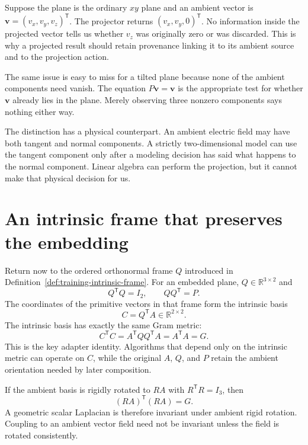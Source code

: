 Suppose the plane is the ordinary $xy$ plane and an ambient vector is
$\mathbf v=(v_x,v_y,v_z)^{\mathsf T}$. The projector returns
$(v_x,v_y,0)^{\mathsf T}$. No information inside the projected vector tells us
whether $v_z$ was originally zero or was discarded. This is why a projected
result should retain provenance linking it to its ambient source and to the
projection action.

The same issue is easy to miss for a tilted plane because none of the ambient
components need vanish. The equation $P\mathbf v=\mathbf v$ is the appropriate
test for whether $\mathbf v$ already lies in the plane. Merely observing three
nonzero components says nothing either way.

The distinction has a physical counterpart. An ambient electric field may have
both tangent and normal components. A strictly two-dimensional model can use
the tangent component only after a modeling decision has said what happens to
the normal component. Linear algebra can perform the projection, but it cannot
make that physical decision for us.

\section{An intrinsic frame that preserves the embedding}

Return now to the ordered orthonormal frame $Q$ introduced in
Definition~\ref{def:training-intrinsic-frame}. For an embedded plane,
$Q\in\mathbb R^{3\times2}$ and
\begin{equation}
  Q^{\mathsf T}Q=I_2,
  \qquad
  QQ^{\mathsf T}=P.
  \label{eq:training-plane-frame}
\end{equation}
The coordinates of the primitive vectors in that frame form the intrinsic
basis
\begin{equation}
  C=Q^{\mathsf T}A\in\mathbb R^{2\times2}.
  \label{eq:training-intrinsic-adapter}
\end{equation}
The intrinsic basis has exactly the same Gram metric:
\begin{equation}
  C^{\mathsf T}C
  =A^{\mathsf T}QQ^{\mathsf T}A
  =A^{\mathsf T}A
  =G.
  \label{eq:training-adapter-metric-identity}
\end{equation}
This is the key adapter identity. Algorithms that depend only on the intrinsic
metric can operate on $C$, while the original $A$, $Q$, and $P$ retain the
ambient orientation needed by later composition.

If the ambient basis is rigidly rotated to $RA$ with
$R^{\mathsf T}R=I_3$, then
\begin{equation}
  (RA)^{\mathsf T}(RA)=G.
  \label{eq:training-rotation-invariance}
\end{equation}
A geometric scalar Laplacian is therefore invariant under ambient rigid
rotation. Coupling to an ambient vector field need not be invariant unless the
field is rotated consistently.

